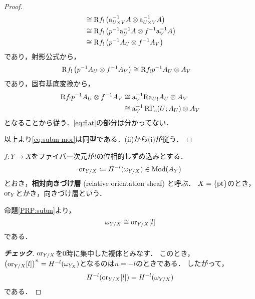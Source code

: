 \begin{proof}
\begin{align*}
        &\cong \mathrm{R} f_!\left(
            \mathrm{a}^{-1}_{{U\times V}}A
            \otimes
            \mathrm{a}^{-1}_{{U\times V}}A
        \right)\\
        &\cong \mathrm{R} f_!\left(
            p^{-1}\mathrm{a}^{-1}_{U}A
            \otimes
            f^{-1}\mathrm{a}^{-1}_{V}A
        \right)\\
        &\cong \mathrm{R} f_!\left(
            p^{-1}A_{U}
            \otimes
            f^{-1}A_{V}
        \right)
    \end{align*}
    であり，射影公式から，
    \begin{align*}
        \mathrm{R} f_!\left(
            p^{-1}A_{U}
            \otimes
            f^{-1}A_{V}
        \right)
        &\cong \mathrm{R} f_!p^{-1}A_{U}\otimes A_{V}
    \end{align*}
    であり，固有基底変換から，
    \begin{align*}
        \mathrm{R} f_!p^{-1}A_{U}\otimes f^{-1}A_{V}
        &\cong
        \mathrm{a}^{-1}_{V} \mathrm{R}{\mathrm{a}_{U}}_! A_U\otimes A_V\\
        &\cong
        \mathrm{a}^{-1}_{V}\mathop{\mathrm{R}\hspace{-0pt}\Gamma}\nolimits_c(U;A_U)\otimes A_V
    \end{align*}
    となることから従う．\eqref{eq:flat}の部分は分かってない．
    
    以上より\eqref{eq:subm-mor}は同型である．(ii)から(i)が従う．
\end{proof}

\begin{DFN}
    \(f\colon Y\to X\)をファイバー次元が\(l\)の位相的しずめ込みとする．
    \[
        \mathord{\mathrm{or}}_{Y/X}\coloneqq H^{-l}(\omega_{Y/X})\in\mathop{\mathrm{Mod}}\nolimits(A_Y)
    \]
    とおき，\textbf{相対向きづけ層} (relative orientation sheaf) 
    と呼ぶ．
    \(X=\{\mathop{\mathrm{pt}}\nolimits\}\)のとき，\(\mathord{\mathrm{or}}_Y\)とかき，向きづけ層という．
\end{DFN}

命題\ref{PRP:subm}より，
\begin{equation}
    \omega_{Y/X}\cong \mathord{\mathrm{or}}_{Y/X}[l]
\end{equation}
である．

\begin{proof}[\textbf{チェック}]
    \(\mathord{\mathrm{or}}_{Y/X}\)を0時に集中した複体とみなす．
    このとき，\(
        \left(\mathord{\mathrm{or}}_{Y/X}[l]\right)^n=H^{-l}(\omega_{Y_X})
    \)となるのは\(n=-l\)のときである．
    したがって，\[
        H^{-l}(\mathord{\mathrm{or}}_{Y/X}[l])=H^{-l}(\omega_{Y/X})
    \]
    である．
\end{proof}

